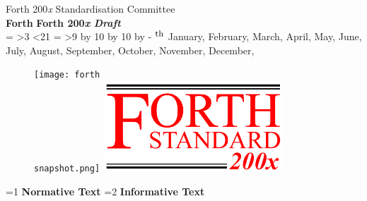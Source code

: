 \begin{titlepage}
\begin{flushright}
\LARGE
Forth 200\emph{x} Standardisation Committee \\[.2in]
\ifrelease
	\textbf{Forth \snapshot{} \release}
\else
	\textbf{Forth 200\emph{x} \textit{Draft \docversion}}
\fi \\[.2in]

\number\day%
%
\makeatletter
\@tempcnta=\day
\ifnum\@tempcnta>3
	\ifnum\@tempcnta<21
	\fi
\fi
%
\@tempcntb=\@tempcnta
\ifnum\@tempcnta>9
	\divide  \@tempcnta by 10
	\multiply\@tempcnta by 10
	\advance \@tempcntb by -\@tempcnta
\fi
%
$^{\mbox{\small
\ifcase\@tempcntb
    th%
\or st%
\or nd%
\or rd%
\else th\fi
}}$
\makeatother
%
\ifcase\month
\or January,
\or February,
\or March,
\or April,
\or May,
\or June,
\or July,
\or August,
\or September,
\or October,
\or November,
\or December,
\fi
%
\number\year
\end{flushright}

\vfill
\begin{figure}[ht]
  \begin{center}
	\ifrelease
		\texttt{[image: forth\\snapshot.png]}
	\else
		\includegraphics[bb=0 0 500 252,width=0.6\textwidth]{logo.png}
	\fi
  \end{center}
\end{figure}
\vfill


\makeatletter
\@tempswafalse
\ifinline
	\begin{center}
		\huge %
		\ifnum\value{part}=1 \textbf{Normative Text}\fi
		\ifnum\value{part}=2 \textbf{Informative Text}\fi
	\end{center}
\fi
\makeatother

\vfill


%



\end{titlepage}
